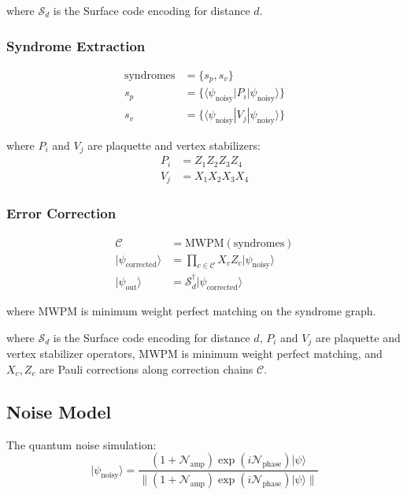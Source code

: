 \documentclass{article}
\begin{document}
where $\mathcal{S}_d$ is the Surface code encoding for distance $d$.

\subsubsection{Syndrome Extraction}
\begin{align*}
\text{syndromes} &= \{s_p, s_v\} \\
s_p &= \{\langle \psi_{\text{noisy}}|P_i|\psi_{\text{noisy}}\rangle\} \\
s_v &= \{\langle \psi_{\text{noisy}}|V_j|\psi_{\text{noisy}}\rangle\}
\end{align*}

where $P_i$ and $V_j$ are plaquette and vertex stabilizers:
\begin{align*}
P_i &= Z_1Z_2Z_3Z_4 \\
V_j &= X_1X_2X_3X_4
\end{align*}

\subsubsection{Error Correction}
\begin{align*}
\mathcal{C} &= \text{MWPM}(\text{syndromes}) \\
|\psi_{\text{corrected}}\rangle &= \prod_{c \in \mathcal{C}} X_c Z_c |\psi_{\text{noisy}}\rangle \\
|\psi_{\text{out}}\rangle &= \mathcal{S}_d^\dagger|\psi_{\text{corrected}}\rangle
\end{align*}

where MWPM is minimum weight perfect matching on the syndrome graph.

where $\mathcal{S}_d$ is the Surface code encoding for distance $d$, $P_i$ and $V_j$ are plaquette and vertex stabilizer operators, MWPM is minimum weight perfect matching, and $X_c, Z_c$ are Pauli corrections along correction chains $\mathcal{C}$.

\subsection{Noise Model}
The quantum noise simulation:
\begin{equation}
|\psi_{\text{noisy}}\rangle = \frac{(1 + \mathcal{N}_{\text{amp}})\exp(i\mathcal{N}_{\text{phase}})|\psi\rangle}{\|(1 + \mathcal{N}_{\text{amp}})\exp(i\mathcal{N}_{\text{phase}})|\psi\rangle\|}
\end{equation}
\end{document}
